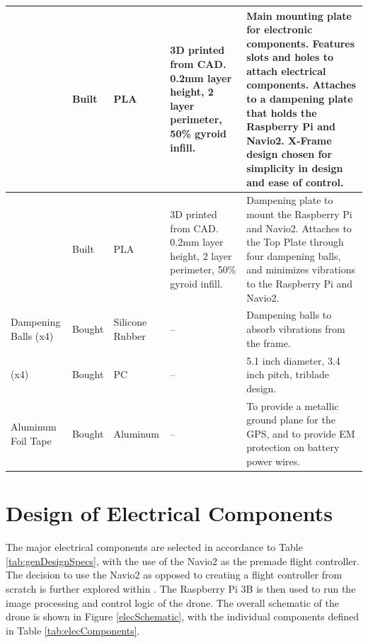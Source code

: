 \documentclass[12pt, titlepage]{article}
\begin{document}
\begin{landscape}
\begin{table}[!h]
\begin{center}
\begin{tabular}{ | m{2.7cm} | m{1.9cm} | m{1.4cm} | m{5.5cm} | m{10.3cm} | }
\hline
\nameref{Top Plate} & Built & PLA & 3D printed from CAD. 0.2mm layer height, 2 layer perimeter, 50\% gyroid infill. & 
    Main mounting plate for electronic components. Features slots and holes to attach electrical components. Attaches to a dampening plate that holds the Raspberry Pi and Navio2. X-Frame design chosen for simplicity in design and ease of control. \\
\hline
\nameref{Dampening Plate} & Built & PLA & 3D printed from CAD. 0.2mm layer height, 2 layer perimeter, 50\% gyroid infill. & 
    Dampening plate to mount the Raspberry Pi and Navio2. Attaches to the Top Plate through four dampening balls, and minimizes vibrations to the Raspberry Pi and Navio2. \\
\hline
Dampening Balls (x4) & Bought & Silicone Rubber & -- & 
    Dampening balls to absorb vibrations from the frame. \\
\hline
\nameref{Propeller} (x4) & Bought & PC & -- & 
    5.1 inch diameter, 3.4 inch pitch, triblade design. \\
\hline
Aluminum Foil Tape & Bought & Aluminum & -- & 
    To provide a metallic ground plane for the GPS, and to provide EM protection on battery power wires. \\
\hline
\end{tabular}
\end{center}
\end{table}
\end{landscape}

\clearpage

\section{Design of Electrical Components}
\label{sec:elecComponents}

The major electrical components are selected in accordance to Table \ref{tab:genDesignSpecs}, with the use of the Navio2 as the premade flight controller. The decision to use the Navio2 as opposed to creating a flight controller from scratch is further explored within . The Raspberry Pi 3B is then used to run the image processing and control logic of the drone. The overall schematic of the drone is shown in Figure \ref{elecSchematic}, with the individual components defined in Table \ref{tab:elecComponents}.
\end{document}

